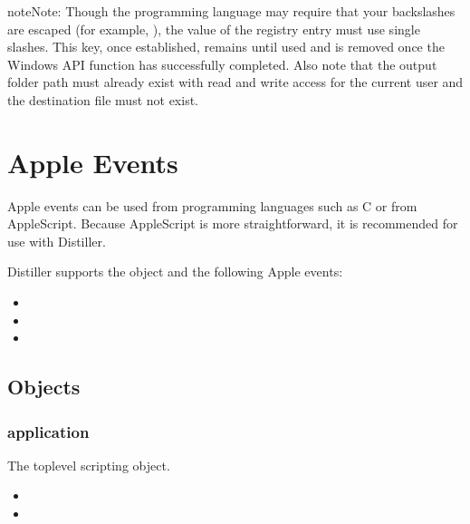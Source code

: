 \documentclass[letterpaper,12pt,english,openany,oneside]{sphinxmanual}
\begin{document}
\begin{sphinxadmonition}{note}{Note:}
Though the programming language may require that your backslashes are escaped (for example,  ), the value of the registry entry must use single slashes. This key, once established, remains until used and is removed once the Windows API function  has successfully completed. Also note that the output folder path must already exist with read and write access for the current user and the destination file must not exist.
\end{sphinxadmonition}


\chapter{Apple Events}
\label{\detokenize{Distiller_Mac:apple-events}}\label{\detokenize{Distiller_Mac::doc}}
Apple events can be used from programming languages such as C or from AppleScript. Because AppleScript is more straightforward, it is recommended for use with Distiller.

Distiller supports the  object and the following Apple events:
\begin{itemize}
\item {} 

\item {} 

\item {} 

\end{itemize}


\section{Objects}
\label{\detokenize{Distiller_Mac:objects}}




\subsection{application}
\label{\detokenize{Distiller_Mac:application}}
The top\sphinxhyphen{}level scripting object.

\begin{itemize}
\item {} 

\item {} 

\end{itemize}
\end{document}
